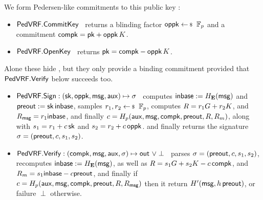 \noindent We form Pedersen-like commitments to this public key \pk:
\begin{itemize}
\item ${\mathsf{PedVRF}}.{\mathsf{CommitKey}}$ \,
returns a blinding factor $\openpk \leftsample \F_p$
and a commitment $\mathsf{compk} = \mathsf{pk} + \mathsf{oppk} \, K$.
\item ${\mathsf{PedVRF}}.{\mathsf{OpenKey}}$ \,
returns $\mathsf{pk} = \mathsf{compk} - \mathsf{oppk} \, K$.
\end{itemize}
Alone these hide \pk, but they only provide a binding commitment
provided that ${\mathsf{PedVRF}}.{\mathsf{Verify}}$ below succeeds too.

\begin{itemize}
\item ${\mathsf{PedVRF}}.{\mathsf{Sign}} : (\mathsf{sk},\mathsf{oppk},\mathsf{msg},\mathsf{aux}) \mapsto \sigma$ \,
    computes ${\mathsf{inbase}} := H_{{\mathbf{E}}}(\mathsf{msg})$ and ${\mathsf{preout}} := \mathsf{sk} \, {\mathsf{inbase}}$,
    samples $r_1,r_2 \leftsample \F_p$,
    computes $R = r_1 G + r_2 K$, and $R_\mathsf{msg} = r_1 {\mathsf{inbase}}$, and
    finally $c = H_p(\mathsf{aux},\mathsf{msg},\mathsf{compk},{\mathsf{preout}},R,R_m)$,
     along with $s_1 = r_1 + c \, \mathsf{sk}$ and $s_2 = r_2 + c \, \mathsf{oppk}$.
    and finally returns the signature $\sigma = ({\mathsf{preout}},c,s_1,s_2)$.
\item ${\mathsf{PedVRF}}.{\mathsf{Verify}} : (\mathsf{compk},\mathsf{msg},\mathsf{aux},\sigma) \mapsto {\ensuremath{\mathsf{out}}} \,\, \lor \perp$ \,
    parses $\sigma = ({\mathsf{preout}},c,s_1,s_2)$, 
    recomputes ${\mathsf{inbase}} := H_{{\mathbf{E}}}(\mathsf{msg})$, as well as
    $R = s_1 G + s_2 K - c \, \mathsf{compk}$, and
    $R_m = s_1 {\mathsf{inbase}} - c {\mathsf{preout}}$, and finally
    if $c = H_p(\mathsf{aux},\mathsf{msg},\mathsf{compk},{\mathsf{preout}},R,R_\mathsf{msg})$ then it return $H'(\mathsf{msg}, h \, {\mathsf{preout}})$, 
         or failure $\perp$ otherwise.
\end{itemize}

